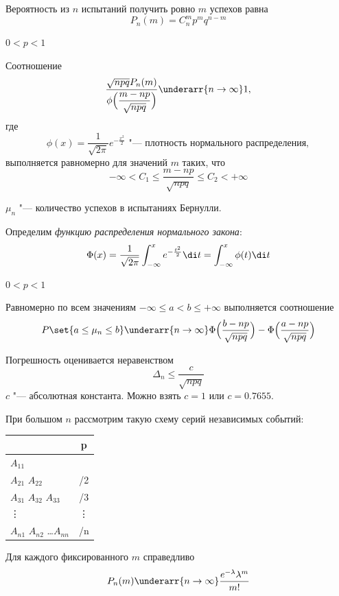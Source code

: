 \begin{statement}
	Вероятность из $ n $ испытаний получить ровно $ m $ успехов равна
	$$ P_n(m) = C_n^m p^mq^{n - m} $$
\end{statement}

\begin{theorem}
	$ 0 < p < 1 $

	Соотношение
	$$ \frac{\sqrt{npq}P_n(m)}{\phi \Bigl( \dfrac{m - np}{\sqrt{npq}} \Bigr)}
	\underarr{n \to \infty} 1, $$
	где
	$$ \phi(x) = \frac1{\sqrt{2\pi}} e^{-\frac{x^2}2}
	\text{ "--- плотность нормального распределения}, $$
	выполняется равномерно для значений $ m $ таких, что
	$$ -\infty < C_1 \le \frac{m - np}{\sqrt{npq}} \le C_2 < +\infty $$
\end{theorem}

\begin{notation}
	$ \mu_n $ "--- количество успехов в испытаниях Бернулли.
\end{notation}

\begin{notation}
	Определим \emph{функцию распределения нормального закона}:
	$$ \Phi(x) = \frac1{\sqrt{2\pi}} \int_{-\infty}^x e^{-\frac{t^2}2} \di t =
	\int_{-\infty}^x \phi(t) \di t $$
\end{notation}

\begin{theorem}
	$ 0 < p < 1 $

	Равномерно по всем значениям $ -\infty \le a < b \le +\infty $ выполняется соотношение
	$$ P\set{a \le \mu_n \le b} \underarr{n \to \infty}
	\Phi \Bigl( \frac{b - np}{\sqrt{npq}} \Bigr) - \Phi \Bigl( \frac{a - np}{\sqrt{npq}} \Bigr) $$
\end{theorem}

Погрешность оценивается неравенством
$$ \Delta_n \le \frac c{\sqrt{npq}} $$
$ c $ "--- абсолютная константа.
Можно взять $ c = 1 $ или $ c = 0.7655 $.

\begin{theorem}
	При большом $ n $ рассмотрим такую схему серий независимых событий: \\
	\begin{tabular}{l | c}
		& p \\
		\hline
		$ A_{11} $ & \lambda \\
		$ A_{21} $ $ A_{22} $ & \lambda/2 \\
		$ A_{31} $ $ A_{32} $ $ A_{33} $ & \lambda/3 \\
		\vdots & \vdots \\
		$ A_{n1} $ $ A_{n2} $ \dots $ A_{nn} $ & \lambda/n
	\end{tabular}

	Для каждого фиксированного $ m $ справедливо
	$$ P_n(m) \underarr{n \to \infty} \frac{e^{-\lambda}\lambda^m}{m!} $$
\end{theorem}

